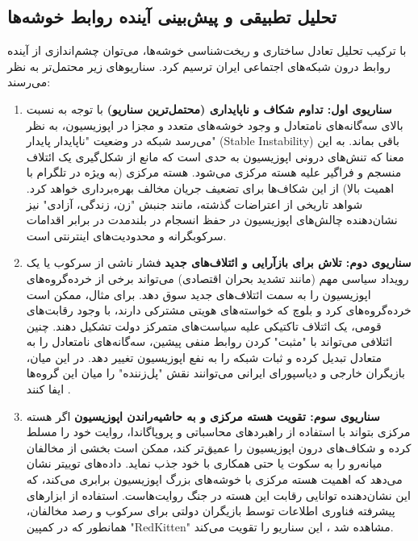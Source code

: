\documentclass{article}
\begin{document}
	\subsection{تحلیل تطبیقی و پیش‌بینی آینده روابط خوشه‌ها}
	با ترکیب تحلیل تعادل ساختاری و ریخت‌شناسی خوشه‌ها، می‌توان چشم‌اندازی از آینده روابط درون شبکه‌های اجتماعی ایران ترسیم کرد. سناریوهای زیر محتمل‌تر به نظر می‌رسند:
	
	\begin{enumerate}
		\item \textbf{سناریوی اول: تداوم شکاف و ناپایداری (محتمل‌ترین سناریو)} با توجه به نسبت بالای سه‌گانه‌های نامتعادل و وجود خوشه‌های متعدد و مجزا در اپوزیسیون، به نظر می‌رسد شبکه در وضعیت "ناپایدار پایدار" (Stable Instability) باقی بماند. به این معنا که تنش‌های درونی اپوزیسیون به حدی است که مانع از شکل‌گیری یک ائتلاف منسجم و فراگیر علیه هسته مرکزی می‌شود. هسته مرکزی (به ویژه در تلگرام با اهمیت بالا) از این شکاف‌ها برای تضعیف جریان مخالف بهره‌برداری خواهد کرد. شواهد تاریخی از اعتراضات گذشته، مانند جنبش "زن، زندگی، آزادی" نیز نشان‌دهنده چالش‌های اپوزیسیون در حفظ انسجام در بلندمدت در برابر اقدامات سرکوبگرانه و محدودیت‌های اینترنتی است.
		
		\item \textbf{سناریوی دوم: تلاش برای بازآرایی و ائتلاف‌های جدید} فشار ناشی از سرکوب یا یک رویداد سیاسی مهم (مانند تشدید بحران اقتصادی) می‌تواند برخی از خرده‌گروه‌های اپوزیسیون را به سمت ائتلاف‌های جدید سوق دهد. برای مثال، ممکن است خرده‌گروه‌های کرد و بلوچ که خواسته‌های هویتی مشترکی دارند، با وجود رقابت‌های قومی، یک ائتلاف تاکتیکی علیه سیاست‌های متمرکز دولت تشکیل دهند. چنین ائتلافی می‌تواند با "مثبت" کردن روابط منفی پیشین، سه‌گانه‌های نامتعادل را به متعادل تبدیل کرده و ثبات شبکه را به نفع اپوزیسیون تغییر دهد. در این میان، بازیگران خارجی و دیاسپورای ایرانی می‌توانند نقش "پل‌زننده" را میان این گروه‌ها ایفا کنند .
		
		\item \textbf{سناریوی سوم: تقویت هسته مرکزی و به حاشیه‌راندن اپوزیسیون} اگر هسته مرکزی بتواند با استفاده از راهبردهای محاسباتی و پروپاگاندا، روایت خود را مسلط کرده و شکاف‌های درون اپوزیسیون را عمیق‌تر کند، ممکن است بخشی از مخالفان میانه‌رو را به سکوت یا حتی همکاری با خود جذب نماید. داده‌های توییتر نشان می‌دهد که اهمیت هسته مرکزی با خوشه‌های بزرگ اپوزیسیون برابری می‌کند، که این نشان‌دهنده توانایی رقابت این هسته در جنگ روایت‌هاست. استفاده از ابزارهای پیشرفته فناوری اطلاعات توسط بازیگران دولتی برای سرکوب و رصد مخالفان، همانطور که در کمپین "RedKitten" مشاهده شد ، این سناریو را تقویت می‌کند.
	\end{enumerate}
\end{document}
